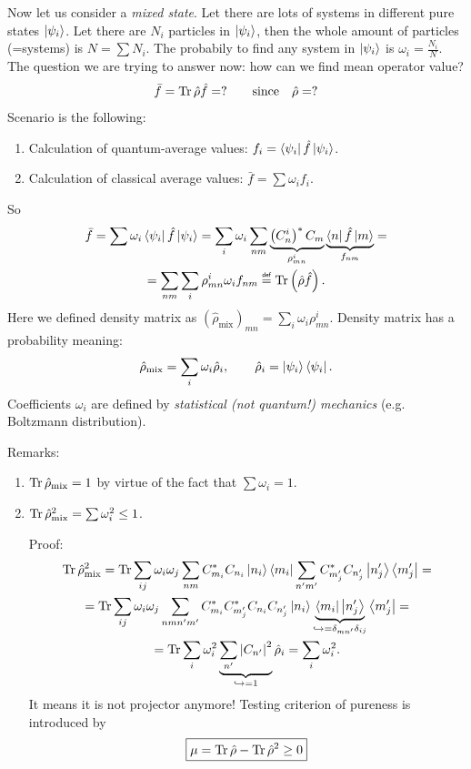 Now let us consider a \textit{mixed state}. Let there are lots of systems in different pure states $\left\lvert {\psi_i} \right\rangle$. Let there are $N_i$ particles in $\left\lvert {\psi_i} \right\rangle$, then the whole amount of particles (=systems) is $N = \sum N_i$. The probabily to find any system in $\left\lvert {\psi_i} \right\rangle$ is $\omega_i = \frac{N_i}{N}$. The question we are trying to answer now: how can we find mean operator value?
\begin{equation}
	\bar{f} = \operatorname{Tr} \hat{\rho} \hat{f} = ? \qquad \text{since} \quad \hat{\rho} = ?
\end{equation}
Scenario is the following:
\begin{enumerate}
	\item Calculation of quantum-average values: $f_i = \left\langle {\psi_i} \right\rvert \hat{f} \left\lvert {\psi_i} \right\rangle$.
	\item Calculation of classical average values: $\bar{f} = \sum \omega_i f_i$.
\end{enumerate}
So
\begin{multline}
	\bar{f} = \sum \omega_i \bra{\psi_i} \hat{f} \ket{\psi_i} = \sum_i \omega_i \sum_{nm} \underbrace{\left( C_n^i \right)^* C_m}_{\rho_{mn}^i} \underbrace{\bra{n} \hat{f} \ket{m}}_{f_{nm}} = \\
	= \sum_{nm} \sum_i \rho_{mn}^i \omega_i f_{nm} \myeq \Tr \left( \hat{\rho} \hat{f} \right).
\end{multline}
Here we defined density matrix as $\left( \hat{\rho}_{\text{mix}} \right)_{mn} = \sum_i \omega_i \rho_{mn}^i$. Density matrix has a probability meaning:
\begin{equation}
	\hat{\rho}_{\text{mix}} = \sum_i \omega_i \hat{\rho}_i, \qquad \hat{\rho}_i = \left\lvert {\psi_i} \right\rangle \left\langle {\psi_i} \right\rvert.
\end{equation}
Coefficients $\omega_i$ are defined by \textit{statistical (not quantum!) mechanics} (e.g. Boltzmann distribution).

Remarks:
\begin{enumerate}
	\item $\operatorname{Tr} \hat{\rho}_{\text{mix}} = 1$ by virtue of the fact that $\sum \omega_i = 1$.
	\item $\operatorname{Tr} \hat{\rho}_{\text{mix}}^2 = \sum \omega_i^2 \le 1$.
	
	Proof:
	\begin{multline}
		\operatorname{Tr} \hat{\rho}_{\text{mix}}^2 = \operatorname{Tr} \sum_{ij} \omega_i \omega_j \sum_{n m} C^*_{m_i} C_{n_i} \left\lvert {n_i} \right\rangle \left\langle {m_i} \right\rvert \sum_{n' m'} C^*_{m_j'} C_{n_j'} \left\lvert {n_j'} \right\rangle \left\langle {m_j'} \right\rvert = \\ = \operatorname{Tr}
		\sum_{ij} \omega_i \omega_j \sum_{nmn'm'} C_{m_i}^* C^*_{m_j'}C_{n_i} C_{n_j'} \left\lvert {n_i} \right\rangle \underbrace{\left\langle {m_i} \right\rvert \left\lvert {n_j'} \right\rangle}_{\hookrightarrow=\delta_{mn'} \delta_{ij}} \left\langle {m_j'} \right\rvert = \\ = \operatorname{Tr} \sum_i \omega_i^2  \underbrace{\sum_{n'} \left|C_{n'}\right|^2}_{\hookrightarrow = 1} \hat{\rho}_i = \sum_i \omega_i^2.
	\end{multline}
	It means it is not projector anymore! Testing criterion of pureness is introduced by
	\begin{equation}
		\boxed{\mu = \operatorname{Tr} \hat{\rho} - \operatorname{Tr} \hat{\rho}^2 \ge 0}
	\end{equation}
\end{enumerate}

